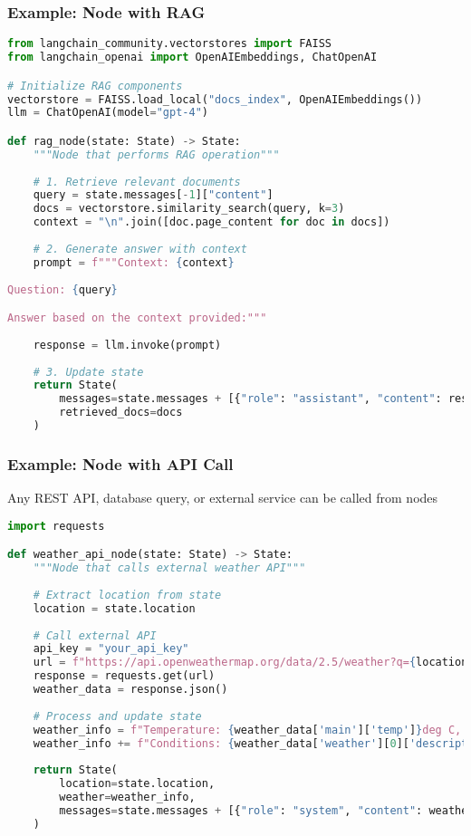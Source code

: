 \begin{frame}[fragile]\frametitle{Example: Node with RAG}
      \begin{lstlisting}[language=Python, basicstyle=\tiny]
from langchain_community.vectorstores import FAISS
from langchain_openai import OpenAIEmbeddings, ChatOpenAI

# Initialize RAG components
vectorstore = FAISS.load_local("docs_index", OpenAIEmbeddings())
llm = ChatOpenAI(model="gpt-4")

def rag_node(state: State) -> State:
    """Node that performs RAG operation"""
    
    # 1. Retrieve relevant documents
    query = state.messages[-1]["content"]
    docs = vectorstore.similarity_search(query, k=3)
    context = "\n".join([doc.page_content for doc in docs])
    
    # 2. Generate answer with context
    prompt = f"""Context: {context}
    
Question: {query}

Answer based on the context provided:"""
    
    response = llm.invoke(prompt)
    
    # 3. Update state
    return State(
        messages=state.messages + [{"role": "assistant", "content": response.content}],
        retrieved_docs=docs
    )
      \end{lstlisting}
\end{frame}

\begin{frame}[fragile]\frametitle{Example: Node with API Call}
 Any REST API, database query, or external service can be called from nodes
 
      \begin{lstlisting}[language=Python, basicstyle=\tiny]
import requests

def weather_api_node(state: State) -> State:
    """Node that calls external weather API"""
    
    # Extract location from state
    location = state.location
    
    # Call external API
    api_key = "your_api_key"
    url = f"https://api.openweathermap.org/data/2.5/weather?q={location}&appid={api_key}"
    response = requests.get(url)
    weather_data = response.json()
    
    # Process and update state
    weather_info = f"Temperature: {weather_data['main']['temp']}deg C, "
    weather_info += f"Conditions: {weather_data['weather'][0]['description']}"
    
    return State(
        location=state.location,
        weather=weather_info,
        messages=state.messages + [{"role": "system", "content": weather_info}]
    )
      \end{lstlisting}
      
\end{frame}

